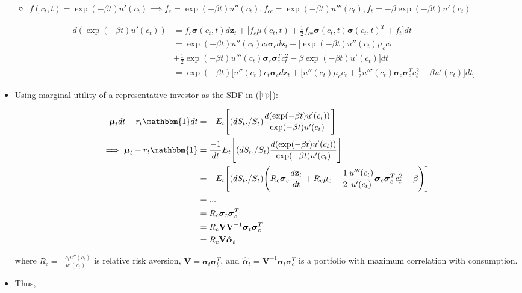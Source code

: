 \documentclass{article}
\newcommand{\Vbf}{\mathbf{V}}
\newcommand{\zbf}{\mathbf{z}}
\newcommand{\mubf}{\boldsymbol{\mu}}
\newcommand{\alphabf}{\boldsymbol{\alpha}}
\newcommand{\sigmabf}{\boldsymbol{\sigma}}
\newcommand{\onebf}{\mathbbm{1}}
\begin{document}
\begin{itemize}
\begin{itemize}
\item $f(c_t, t) = \exp(-\beta t) u'(c_t) \implies f_c = \exp(-\beta t) u''(c_t), f_{cc} = \exp(-\beta t) u'''(c_t), f_t = -\beta\exp(-\beta t) u'(c_t)$

\begin{align}
d(\exp(-\beta t) u'(c_t))
&= f_c \sigmabf(c_t, t) d\zbf_t + \Bigg[f_c \mu(c_t, t)   + \frac{1}{2} f_{cc} \sigmabf(c_t, t)\sigmabf(c_t, t)^{T} + f_t \Bigg] dt \nonumber \\
&=  \exp(-\beta t) u''(c_t) c_t \sigmabf_c d\zbf_t + \Bigg[\exp(-\beta t) u''(c_t) \mu_c c_t \nonumber \\ 
&+ \frac{1}{2} \exp(-\beta t) u'''(c_t) \sigmabf_c\sigmabf_c^T c_t^2 -\beta\exp(-\beta t) u'(c_t) \Bigg] dt \nonumber \\
&= \exp(-\beta t) \Bigg[u''(c_t) c_t \sigmabf_c d\zbf_t + \Bigg[ u''(c_t) \mu_c c_t  + \frac{1}{2}  u'''(c_t) \sigmabf_c\sigmabf_c^T c_t^2 -\beta u'(c_t) \Bigg] dt\Bigg] \label{dpi}
\end{align}

\end{itemize}

\item Using marginal utility of a representative investor as the SDF in ($\ref{rp}$):

\begin{align*}
\mubf_t dt - r_t \onebf  dt
&= - E_t \Bigg[(dS_t ./ S_t) \frac{d (\exp(-\beta t) u'(c_t))}{\exp(-\beta t) u'(c_t)} \Bigg]\\
\implies \mubf_t - r_t \onebf 
&= \frac{-1}{dt} E_t \Bigg[(dS_t ./ S_t) \frac{d (\exp(-\beta t) u'(c_t))}{\exp(-\beta t) u'(c_t)} \Bigg]\\
&= - E_t \Bigg[(dS_t ./ S_t) \Bigg(R_c \sigmabf_c \frac{d\zbf_t}{dt} + R_c  \mu_c  + \frac{1}{2}  \frac{u'''(c_t)}{u'(c_t)} \sigmabf_c\sigmabf_c^T c_t^2 -\beta \Bigg) \Bigg]\\
&= ...\\
&= R_c \sigmabf_t \sigmabf_c^T \\
&= R_c \Vbf \Vbf^{-1}\sigmabf_t \sigmabf_c^T \\
&= R_c \Vbf \hat{\alphabf}_t
\end{align*}

where $R_c = \frac{-c_t u''(c_t)}{u'(c_t)}$ is relative risk aversion, $\Vbf = \sigmabf_t \sigmabf_t^T$, and $\hat{\alphabf}_t = \Vbf^{-1}\sigmabf_t \sigmabf_c^T$ is a portfolio with maximum correlation with consumption.

\item Thus, 


\end{itemize}
\end{document}
